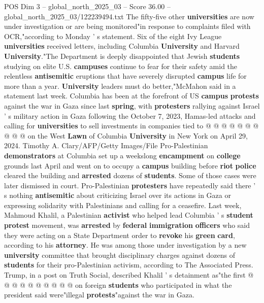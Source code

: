 \begin{textsample}{POS Dim 3 – global\_north\_2025\_03 – Score 36.00 – global\_north\_2025\_03/122239494.txt}
The fifty-five other \textbf{universities} are now under investigation or are being monitored"in response to complaints filed with OCR,"according to Monday ' s statement.
Six of the eight Ivy League \textbf{universities} received letters, including Columbia \textbf{University} and Harvard \textbf{University}."The Department is deeply disappointed that Jewish \textbf{students} studying on elite U.S. \textbf{campuses} continue to fear for their safety amid the relentless \textbf{antisemitic} eruptions that have severely disrupted \textbf{campus} life for more than a year. \textbf{University} leaders must do better,"McMahon said in a statement last week.
Columbia has been at the forefront of US \textbf{campus} \textbf{protests} against the war in Gaza since last \textbf{spring}, with \textbf{protesters} rallying against Israel ' s military action in Gaza following the October 7, 2023, Hamas-led attacks and calling for \textbf{universities} to sell investments in companies tied to @ @ @ @ @ @ @ @ @ @ on the West \textbf{Lawn} of Columbia \textbf{University} in New York on April 29, 2024.
Timothy A.
Clary/AFP/Getty Images/File Pro-Palestinian \textbf{demonstrators} at Columbia set up a weekslong \textbf{encampment} on \textbf{college} grounds last April and went on to occupy a \textbf{campus} building before \textbf{riot} \textbf{police} cleared the building and \textbf{arrested} dozens of \textbf{students}.
Some of those cases were later dismissed in court.
Pro-Palestinian \textbf{protesters} have repeatedly said there ' s nothing \textbf{antisemitic} about criticizing Israel over its actions in Gaza or expressing solidarity with Palestinians and calling for a ceasefire.
Last week, Mahmoud Khalil, a Palestinian \textbf{activist} who helped lead Columbia ' s \textbf{student} \textbf{protest} movement, was \textbf{arrested} by \textbf{federal} \textbf{immigration} \textbf{officers} who said they were acting on a State Department order to \textbf{revoke} his \textbf{green} \textbf{card}, according to his \textbf{attorney}.
He was among those under investigation by a new \textbf{university} committee that brought disciplinary charges against dozens of \textbf{students} for their pro-Palestinian activism, according to The Associated Press.
Trump, in a post on Truth Social, described Khalil ' s detainment as"the first @ @ @ @ @ @ @ @ @ @ on foreign \textbf{students} who participated in what the president said were"illegal \textbf{protests}"against the war in Gaza.

\end{textsample}

